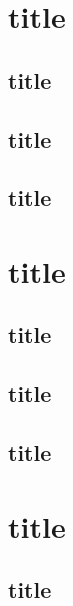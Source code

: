 \documentclass[british,french,11pt, a4paper, openany]{article}
\begin{document}
\section{title}
\subsection{title}
\subsection{title}
\subsection{title}


\section{title}
\subsection{title}
\subsection{title}
\subsection{title}


\section{title}
\subsection{title}
\end{document}
